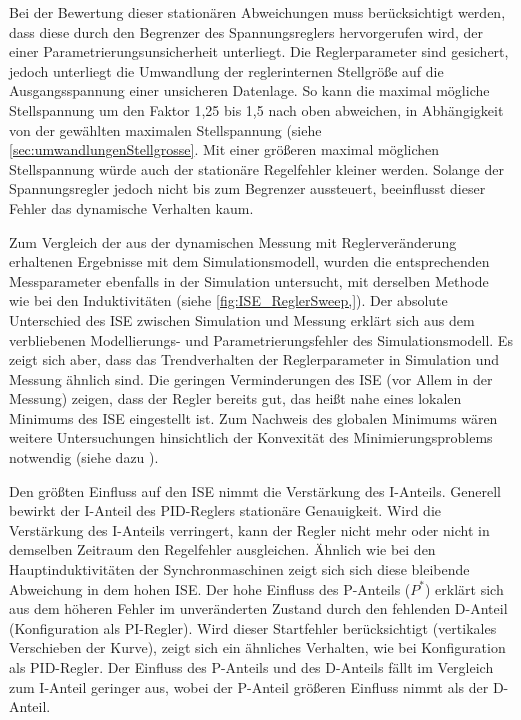 Bei der Bewertung dieser stationären Abweichungen muss berücksichtigt werden, dass diese durch den Begrenzer des Spannungsreglers hervorgerufen wird, der einer Parametrierungsunsicherheit unterliegt. Die Reglerparameter sind gesichert, jedoch unterliegt die Umwandlung der reglerinternen Stellgröße auf die Ausgangsspannung einer unsicheren Datenlage. So kann die maximal mögliche Stellspannung um den Faktor 1,25 bis 1,5 nach oben abweichen, in Abhängigkeit von der gewählten maximalen Stellspannung (siehe \cref{sec:umwandlungenStellgrosse}. Mit einer größeren maximal möglichen Stellspannung würde auch der stationäre Regelfehler kleiner werden. Solange der Spannungsregler jedoch nicht bis zum Begrenzer aussteuert, beeinflusst dieser Fehler das dynamische Verhalten kaum.

Zum Vergleich der aus der dynamischen Messung mit Reglerveränderung erhaltenen Ergebnisse mit dem Simulationsmodell, wurden die entsprechenden Messparameter ebenfalls in der Simulation untersucht, mit derselben Methode wie bei den Induktivitäten (siehe \cref{fig:ISE_ReglerSweep,}). Der absolute Unterschied des ISE zwischen Simulation und Messung erklärt sich aus dem verbliebenen Modellierungs- und Parametrierungsfehler des Simulationsmodell. Es zeigt sich aber, dass das Trendverhalten der Reglerparameter in Simulation und Messung ähnlich sind. Die geringen Verminderungen des ISE (vor Allem in der Messung) zeigen, dass der Regler bereits gut, das heißt nahe eines lokalen Minimums des ISE eingestellt ist. Zum Nachweis des globalen Minimums wären weitere Untersuchungen hinsichtlich der Konvexität des Minimierungsproblems notwendig (siehe dazu \cite{eschVerfahrenZurGuteoptimalen2016}).

Den größten Einfluss auf den ISE nimmt die Verstärkung des I-Anteils. Generell bewirkt der I-Anteil des PID-Reglers stationäre Genauigkeit. Wird die Verstärkung des I-Anteils verringert, kann der Regler nicht mehr oder nicht in demselben Zeitraum den Regelfehler ausgleichen. Ähnlich wie bei den Hauptinduktivitäten der Synchronmaschinen zeigt sich sich diese bleibende Abweichung in dem hohen ISE. Der hohe Einfluss des P-Anteils ($P^*$) erklärt sich aus dem höheren Fehler im unveränderten Zustand durch den fehlenden D-Anteil (Konfiguration als PI-Regler). Wird dieser Startfehler berücksichtigt (vertikales Verschieben der Kurve), zeigt sich ein ähnliches Verhalten, wie bei Konfiguration als PID-Regler. Der Einfluss des P-Anteils und des D-Anteils fällt im Vergleich zum I-Anteil geringer aus, wobei der P-Anteil größeren Einfluss nimmt als der D-Anteil.

